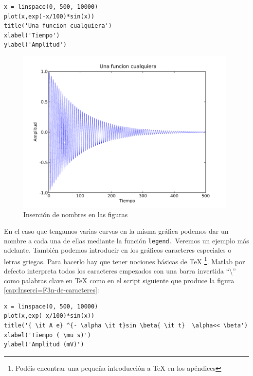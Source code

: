 \begin{verbatim}
x = linspace(0, 500, 10000)
plot(x,exp(-x/100)*sin(x))
title('Una funcion cualquiera')
xlabel('Tiempo')
ylabel('Amplitud')
\end{verbatim}

\begin{figure}[H]
  \centering{}

  \includegraphics[width=11cm,keepaspectratio]{figuras/figuraejemplo4}


  \caption{\label{cap:Inserci=F3n-de-nombres}Inserción de nombres en
    las figuras}
\end{figure}


En el caso que tengamos varias curvas en la misma gráfica podemos dar
un nombre a cada una de ellas mediante la función \texttt{legend.}
Veremos un ejemplo más adelante. También podemos introducir en los
gráficos caracteres especiales o letras griegas. Para hacerlo hay que
tener nociones básicas de \TeX{}%
\footnote{Podéis encontrar una pequeña introducción a \TeX{} en los
  apéndices}. Matlab por defecto interpreta todos los caracteres
empezados con una barra invertida ``\textbackslash{}'' como palabras
clave en \TeX{} como en el script siguiente que produce la figura
\ref{cap:Inserci=F3n-de-caracteres}:

\begin{verbatim}
x = linspace(0, 500, 10000)
plot(x,exp(-x/100)*sin(x))
title('{ \it A e} ^{- \alpha \it t}sin \beta{ \it t}  \alpha<< \beta')
xlabel('Tiempo ( \mu s)')
ylabel('Amplitud (mV)')
\end{verbatim}

